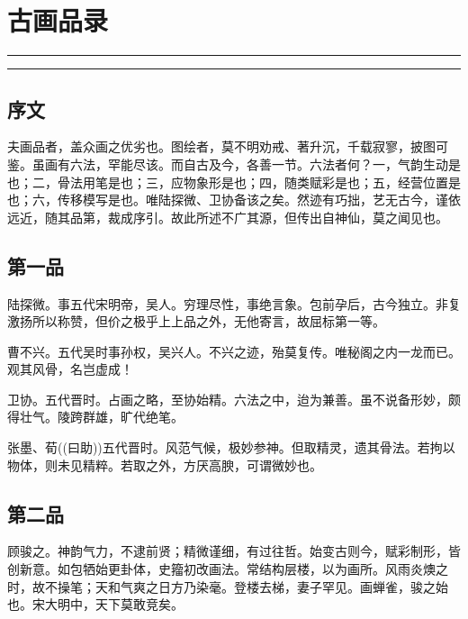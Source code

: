 \documentclass[]{article}
\date{}
\begin{document}
\hypertarget{header-n0}{%
\section{古画品录}\label{header-n0}}

\begin{center}\rule{0.5\linewidth}{\linethickness}\end{center}

\tableofcontents

\begin{center}\rule{0.5\linewidth}{\linethickness}\end{center}

\hypertarget{header-n10}{%
\subsection{序文}\label{header-n10}}

夫画品者，盖众画之优劣也。图绘者，莫不明劝戒、著升沉，千载寂寥，披图可鉴。虽画有六法，罕能尽该。而自古及今，各善一节。六法者何？一，气韵生动是也；二，骨法用笔是也；三，应物象形是也；四，随类赋彩是也；五，经营位置是也；六，传移模写是也。唯陆探微、卫协备该之矣。然迹有巧拙，艺无古今，谨依远近，随其品第，裁成序引。故此所述不广其源，但传出自神仙，莫之闻见也。

\hypertarget{header-n16}{%
\subsection{第一品}\label{header-n16}}

陆探微。事五代宋明帝，吴人。穷理尽性，事绝言象。包前孕后，古今独立。非复激扬所以称赞，但价之极乎上上品之外，无他寄言，故屈标第一等。

曹不兴。五代吴时事孙权，吴兴人。不兴之迹，殆莫复传。唯秘阁之内一龙而已。观其风骨，名岂虚成！

卫协。五代晋时。占画之略，至协始精。六法之中，迨为兼善。虽不说备形妙，颇得壮气。陵跨群雄，旷代绝笔。

张墨、荀((曰助))五代晋时。风范气候，极妙参神。但取精灵，遗其骨法。若拘以物体，则未见精粹。若取之外，方厌高腴，可谓微妙也。

\hypertarget{header-n20}{%
\subsection{第二品}\label{header-n20}}

顾骏之。神韵气力，不逮前贤；精微谨细，有过往哲。始变古则今，赋彩制形，皆创新意。如包牺始更卦体，史籀初改画法。常结构层楼，以为画所。风雨炎燠之时，故不操笔；天和气爽之日方乃染毫。登楼去梯，妻子罕见。画蝉雀，骏之始也。宋大明中，天下莫敢竞矣。
\end{document}
